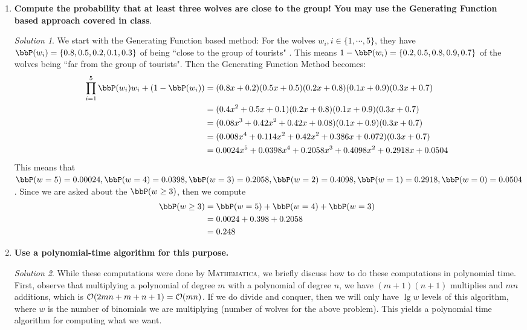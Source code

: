 \documentclass[a4paper,12pt]{article}
\theoremstyle{definition}
\theoremstyle{remark}
\newtheorem*{solution}{Solution}
\begin{document}
	
	\begin{enumerate}
		
		\item {\bf Compute the probability that at least three wolves are close to the group! You may use the Generating Function based approach covered in class}. 
			\begin{solution}
				We start with the Generating Function based method: For the wolves $w_i, i\in\{1,\cdots,5\}$, they have $\bbP(w_i) = \{0.8,0.5,0.2,0.1,0.3\}$ of being ``close to the group of tourists" . This means $1-\bbP(w_i) = \{0.2,0.5,0.8,0.9,0.7\}$ of the wolves being ``far from the group of tourists".  Then the Generating Function Method becomes:
				\begin{align*}
					\prod_{i=1}^5 \bbP(w_i) w_i + (1 - \bbP(w_i)) &= (0.8x + 0.2)(0.5x+0.5)(0.2x+0.8)(0.1x+0.9)(0.3x+0.7)\\
					&= (0.4x^2+0.5x+0.1)(0.2x+0.8)(0.1x+0.9)(0.3x+0.7)\\
					&= (0.08x^3+0.42x^2+0.42x+0.08)(0.1x+0.9)(0.3x+0.7)\\
					&= (0.008x^4+0.114x^2+0.42x^2+0.386x+0.072)(0.3x+0.7)\\
					&= 0.0024x^5 + 0.0398x^4 + 0.2058x^3 + 0.4098x^2 + 0.2918x+0.0504
				\end{align*}
				This means that $\bbP(w=5) = 0.00024, \bbP(w=4) = 0.0398, \bbP(w=3)=0.2058, \bbP(w=2) = 0.4098, \bbP(w=1) = 0.2918, \bbP(w=0)=0.0504$. Since we are asked about the $\bbP(w\geq3)$, then we compute
				\begin{align*}
					\bbP(w\geq 3) &= \bbP(w=5) + \bbP(w=4) + \bbP(w=3)\\
					&= 0.0024+0.398+0.2058\\
					&= 0.248
				\end{align*}
			\end{solution}
		\item {\bf Use a polynomial-time algorithm for this purpose. }
		\begin{solution}
			While these computations were done by \textsc{Mathematica}, we briefly discuss how to do these computations in polynomial time. First, observe that multiplying a polynomial of degree $m$ with a polynomial of degree $n$, we have $(m+1)(n+1)$ multiplies and $mn$ additions, which is $\order{2mn + m+n+1} = \order{mn}$. If we do divide and conquer, then we will only have $\lg w$ levels of this algorithm, where $w$ is  the number of binomials we are multiplying (number of wolves for the above problem). This yields a polynomial time algorithm for computing what we want. 
			

\end{solution}
\end{enumerate}
\end{document}
